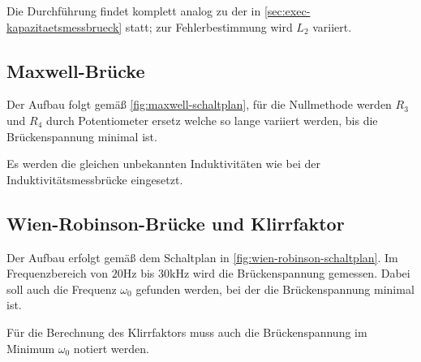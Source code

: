 Die Durchführung findet komplett analog zu der in \autoref{sec:exec-kapazitaetsmessbrueck} statt; zur
Fehlerbestimmung wird $L_2$ variiert.

\subsection{Maxwell-Brücke}
\label{sec:exec-maxwell-bruecke}

Der Aufbau folgt gemäß \autoref{fig:maxwell-schaltplan}, für die Nullmethode werden $R_3$ und 
$R_4$ durch Potentiometer ersetz welche so lange variiert werden, bis die Brückenspannung 
minimal ist.

Es werden die gleichen unbekannten Induktivitäten wie bei der Induktivitätsmessbrücke 
eingesetzt.

\subsection{Wien-Robinson-Brücke und Klirrfaktor}
\label{sec:exec-wien-robinson-bruecke}

Der Aufbau erfolgt gemäß dem Schaltplan in \autoref{fig:wien-robinson-schaltplan}. Im 
Frequenzbereich von $20\si{\hertz}$ bis $30\si{\kilo\hertz}$ wird die Brückenspannung gemessen. 
Dabei soll auch die Frequenz $\omega_0$ gefunden werden, bei der die Brückenspannung minimal ist.

Für die Berechnung des Klirrfaktors muss auch die Brückenspannung im Minimum $\omega_0$ notiert werden.
